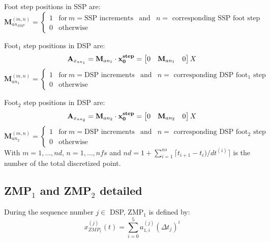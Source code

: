 \documentclass[journal]{IEEEtran}
\begin{document}
Foot step positions in SSP are:
\begin{equation}
\mathbf{M}_{an_{SSP}}^{(m,n)}=
\left\lbrace 
\begin{matrix}
1 & \mbox{for} \ m=\mbox{SSP increments} & \mbox{and} & n=\mbox{ corresponding SSP foot step} \\
0 & \mbox{otherwise} 
\end{matrix}
\right.
\end{equation}

Foot$_1$ step positions in DSP are:
\begin{equation}
\mathbf{A}_{x_{an_{1}}}=\mathbf{M}_{an_{1}}\cdot\mathbf{x^{\mbox{\tiny step}}_0}=
\begin{bmatrix}
0 & \mathbf{M}_{an_{1}} & 0
\end{bmatrix} X
\end{equation}
\begin{equation}
\mathbf{M}_{an_{1}}^{(m,n)}=
\left\lbrace 
\begin{matrix}
1 & \mbox{for} \ m=\mbox{DSP increments} & \mbox{and} & n=\mbox{ corresponding DSP foot$_1$ step} \\
0 & \mbox{otherwise} 
\end{matrix}
\right.
\end{equation}

Foot$_2$ step positions in DSP are:
\begin{equation}
\mathbf{A}_{x_{an_{2}}}=\mathbf{M}_{an_{2}}\cdot\mathbf{x^{\mbox{\tiny step}}_0}=
\begin{bmatrix}
0 & \mathbf{M}_{an_{2}} & 0
\end{bmatrix} X
\end{equation}
\begin{equation}
\mathbf{M}_{an_{2}}^{(m,n)}=
\left\lbrace 
\begin{matrix}
1 & \mbox{for} \ m=\mbox{DSP increments} & \mbox{and} & n=\mbox{ corresponding DSP foot$_2$ step} \\
0 & \mbox{otherwise} 
\end{matrix}
\right.
\end{equation}
With $m =1,\ldots,nd$, $n =1,\ldots,nfs$ and $nd=1+\sum_{i=1}^{ns}{\lceil}t_{i+1}-t_{i})/dt^{(i)}{\rceil}$ is the number of the total discretized point.

\subsection{ZMP$_1$ and ZMP$_2$ detailed}
During the sequence number $j\in$ DSP, ZMP$_1$ is defined by:
\begin{equation}
x_{ZMP_1}^{(j)}(t)=\sum_{i=0}^{5}a_{1,i}^{(j)}(\Delta t_{j})^{i}
\end{equation}
\end{document}
